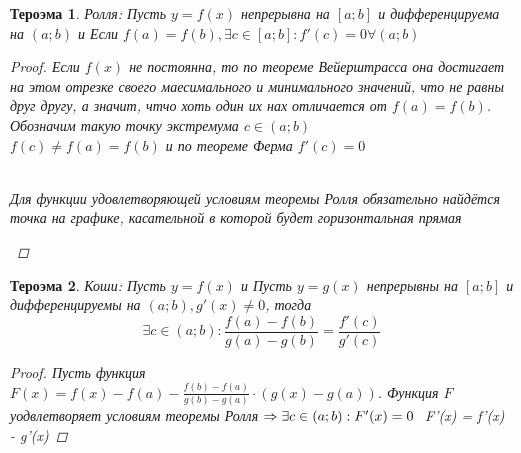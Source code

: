 \documentclass[oneside]{book}
\newtheorem{thm}{Тероэма}[chapter] %
\begin{document}
\begin{enumerate}
\begin{itemize}
\begin{thm}
Ролля: Пусть $y = f(x)$ непрерывна на $[a;b]$ и дифференцируема на $(a;b)$ и Если $f(a) = f(b), \exists c \in [a;b]: f'(c) = 0 \forall (a;b)$

\begin{proof}
  Если $f(x)$ не постоянна, то по теореме Вейерштрасса она достигает на этом отрезке своего маесимального и минимального значений, что не равны друг другу,
  а значит, чтчо хоть один их нах отличается от  $f(a) = f(b)$. Обозначим такую точку экстремума $c \in (a;b)$ \\
  $f(c) \neq f(a) = f(b)$ и по теореме Ферма $f'(c) = 0$
      \begin{center}
            \\
            Для функции удовлетворяющей условиям теоремы Ролля обязательно найдётся точка на графике, касательной в которой будет горизонтальная прямая
          \end{center}
  \end{proof}
\end{thm}
\begin{thm}
  Коши: Пусть $y = f(x)$ и Пусть $y = g(x)$ непрерывны на $[a; b]$ и дифференцируемы на $(a;b), g'(x) \neq 0$, тогда $$
    \exists c \in (a;b): \frac{f(a) - f(b)}{g(a) - g(b)} = \frac{f'(c)}{g'(c)}
  $$
  \begin{proof}
    Пусть функция $F(x) = f(x) - f(a) - \frac{f(b) - f(a)}{g(b) - g(a)} \cdot (g(x) - g(a))$.
    Функция $F$ уодвлетворяет условиям теоремы Ролля $\Rightarrow \\ \exists c \in (a; b): F'(x) = 0$
    $$
      F'(x) = f'(x) -  \cdot g'(x)


\end{proof}
\end{thm}
\end{itemize}
\end{enumerate}
\end{document}
